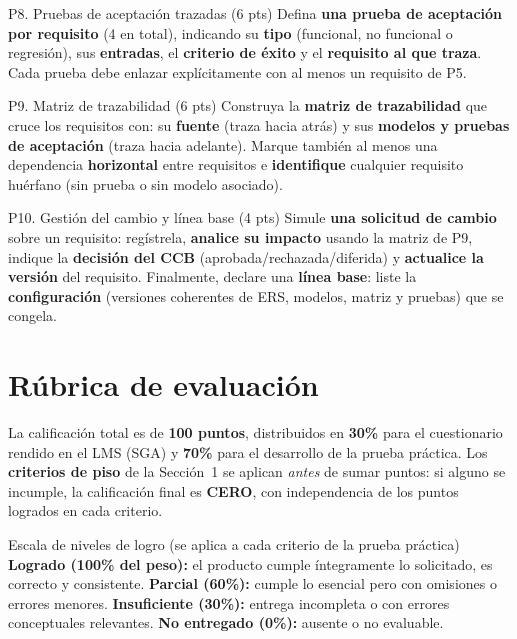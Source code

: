 \documentclass[11pt,a4paper,oneside]{article}
\begin{document}
\newpage


\begin{tarea}{P8. Pruebas de aceptaci\'on trazadas \hfill (6 pts)}
Defina \textbf{una prueba de aceptaci\'on por requisito} (4 en total), indicando su \textbf{tipo} (funcional, no funcional o regresi\'on), sus \textbf{entradas}, el \textbf{criterio de \'exito} y el \textbf{requisito al que traza}. Cada prueba debe enlazar expl\'icitamente con al menos un requisito de P5.
\end{tarea}

\begin{tarea}{P9. Matriz de trazabilidad \hfill (6 pts)}
Construya la \textbf{matriz de trazabilidad} que cruce los requisitos con: su \textbf{fuente} (traza hacia atr\'as) y sus \textbf{modelos y pruebas de aceptaci\'on} (traza hacia adelante). Marque tambi\'en al menos una dependencia \textbf{horizontal} entre requisitos e \textbf{identifique} cualquier requisito hu\'erfano (sin prueba o sin modelo asociado).
\end{tarea}

\begin{tarea}{P10. Gesti\'on del cambio y l\'inea base \hfill (4 pts)}
Simule \textbf{una solicitud de cambio} sobre un requisito: reg\'istrela, \textbf{analice su impacto} usando la matriz de P9, indique la \textbf{decisi\'on del CCB} (aprobada/rechazada/diferida) y \textbf{actualice la versi\'on} del requisito. Finalmente, declare una \textbf{l\'inea base}: liste la \textbf{configuraci\'on} (versiones coherentes de ERS, modelos, matriz y pruebas) que se congela.
\end{tarea}

\section{Rúbrica de evaluaci\'on}

La calificaci\'on total es de \textbf{100 puntos}, distribuidos en \textbf{30\%} para el cuestionario rendido en el LMS (SGA) y \textbf{70\%} para el desarrollo de la prueba pr\'actica. Los \textbf{criterios de piso} de la Secci\'on~1 se aplican \emph{antes} de sumar puntos: si alguno se incumple, la calificaci\'on final es \textbf{CERO}, con independencia de los puntos logrados en cada criterio.

\begin{concepto}{Escala de niveles de logro (se aplica a cada criterio de la prueba pr\'actica)}
\textbf{Logrado (100\% del peso):} el producto cumple \'integramente lo solicitado, es correcto y consistente. \quad \textbf{Parcial (60\%):} cumple lo esencial pero con omisiones o errores menores. \quad \textbf{Insuficiente (30\%):} entrega incompleta o con errores conceptuales relevantes. \quad \textbf{No entregado (0\%):} ausente o no evaluable.
\end{concepto}
\end{document}
